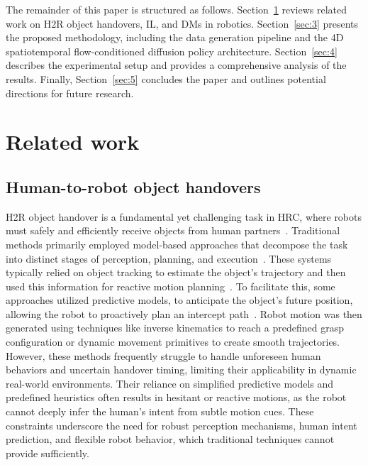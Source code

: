 \documentclass[final,5p,times,twocolumn]{elsarticle}
\begin{document}
The remainder of this paper is structured as follows. Section~\ref{sec:2} reviews related work on H2R object handovers, IL, and DMs in robotics. Section~\ref{sec:3} presents the proposed methodology, including the data generation pipeline and the 4D spatiotemporal flow-conditioned diffusion policy architecture. Section~\ref{sec:4} describes the experimental setup and provides a comprehensive analysis of the results. Finally, Section~\ref{sec:5} concludes the paper and outlines potential directions for future research.


\section{Related work} \label{sec:2}
\subsection{Human-to-robot object handovers}
H2R object handover is a fundamental yet challenging task in HRC, where robots must safely and efficiently receive objects from human partners~\cite{wang2024multimodal, yin2025llm, yi2024safety, guo2024industrial}. Traditional methods primarily employed model-based approaches that decompose the task into distinct stages of perception, planning, and execution~\cite{castro2021trends, yang2022model}. These systems typically relied on object tracking to estimate the object's trajectory and then used this information for reactive motion planning~\cite{sanchez2020benchmark, ovur2021novel}. To facilitate this, some approaches utilized predictive models, to anticipate the object's future position, allowing the robot to proactively plan an intercept path~\cite{wu2019line, zhang2020recurrent}. Robot motion was then generated using techniques like inverse kinematics to reach a predefined grasp configuration or dynamic movement primitives to create smooth trajectories. However, these methods frequently struggle to handle unforeseen human behaviors and uncertain handover timing, limiting their applicability in dynamic real-world environments. Their reliance on simplified predictive models and predefined heuristics often results in hesitant or reactive motions, as the robot cannot deeply infer the human's intent from subtle motion cues. These constraints underscore the need for robust perception mechanisms, human intent prediction, and flexible robot behavior, which traditional techniques cannot provide sufficiently.
\end{document}
